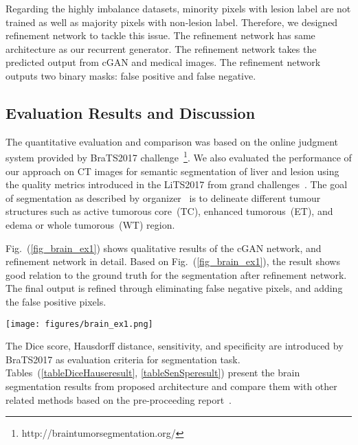 \documentclass[10pt,twocolumn,letterpaper]{article}
\begin{document}
Regarding the highly imbalance datasets, minority pixels with lesion label are not trained as well as majority pixels with non-lesion label. Therefore, we designed refinement network to tackle this issue. The refinement network has same architecture as our recurrent generator. The refinement network takes the predicted output from cGAN and medical images. The refinement network outputs two binary masks: false positive and false negative.

\subsection{Evaluation Results and Discussion}\label{evaluation}
The quantitative evaluation and comparison was based on the online judgment system provided by BraTS2017 challenge~\footnote{http://braintumorsegmentation.org/}.
We also evaluated the performance of our approach on CT images for semantic segmentation of liver and lesion using the quality metrics introduced in the LiTS2017 from grand challenges~\cite{heimann2009comparison}.
The goal of segmentation as described by organizer~\cite{Menze2014,Bakasnature2017,Bakastcg2017,Bakaslgg2017} is to delineate different tumour structures such as active tumorous core~(TC), enhanced tumorous~(ET), and edema or whole tumorous~(WT) region.

Fig.~(\ref{fig_brain_ex1}) shows qualitative results of the cGAN network, and refinement network in detail. Based on Fig.~(\ref{fig_brain_ex1}), the result shows good relation to the ground truth for the segmentation after refinement network. The final output is refined through eliminating false negative pixels, and adding the false positive pixels.

\begin{figure*}[!htbp]
\texttt{[image: figures/brain\_ex1.png]}
\centering
\caption{Visual results from our model on axial views of CBICA-AMF.nz.76-124 from the validation set. The first row shows Flair modality, while the second and fourth row show the output results respectively from cGAN and refinement architecture. The third row shows the semantic segmentation masks from cGAN overlaid Flair modalities where the fifth row shows outputs after refinement network. The red color codes the whole tumour (WT) region, while pink and yellow represent the enhanced tumour (ET) and the tumorous core (TC) respectively.}
\label{fig_brain_ex1}
\end{figure*}

The Dice score, Hausdorff distance, sensitivity, and specificity are introduced by BraTS2017 as evaluation criteria for segmentation task.
Tables~(\ref{tableDiceHauseresult}, \ref{tableSenSperesult}) present the brain segmentation results from proposed architecture and compare them with other related methods based on the pre-proceeding report~\cite{BRATS2017preproceeding}.
\end{document}
